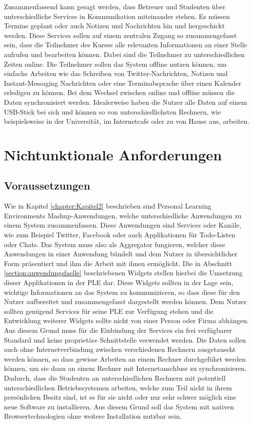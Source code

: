 Zusammenfassend kann gesagt werden, dass Betreuer und Studenten über unterschiedliche Services in Kommunikation miteinander stehen. Es müssen Termine geplant oder auch Notizen und Nachrichten hin und hergeschickt werden. Diese Services sollen auf einem zentralen Zugang so zusammengefasst sein, dass die Teilnehmer des Kurses alle relevanten Informationen an einer Stelle aufrufen und bearbeiten können. Dabei sind die Teilnehmer zu unterschiedlichen Zeiten online. Die Teilnehmer sollen das System offline nutzen können, um einfache Arbeiten wie das Schreiben von Twitter-Nachrichten, Notizen und Instant-Messaging Nachrichten oder eine Terminabsprache über einen Kalender erledigen zu können. Bei dem Wechsel zwischen online und offline müssen die Daten synchronisiert werden. Idealerweise haben die Nutzer alle Daten auf einem USB-Stick bei sich und können so von unterschiedlichsten Rechnern, wie beispielsweise in der Universität, im Internetcafe oder zu von Hause aus, arbeiten.

\section{Nichtunktionale Anforderungen}\label{section:nichtfunktionale_anforderunge}

\subsection{Voraussetzungen}
Wie in Kapitel \ref{chapter:Kapitel2} beschrieben sind Personal Learning Environments Mashup-Anwendungen, welche unterschiedliche Anwendungen zu einem System zusammenfassen. Diese Anwendungen sind Services oder Kanäle, wie zum Beispiel Twitter, Facebook oder auch Applikationen für Todo-Listen oder Chats. Das System muss also als Aggregator fungieren, welcher diese Anwendungen in einer Anwendung bündelt und dem Nutzer in übersichtlicher Form präsentiert und ihm die Arbeit mit ihnen ermöglicht. Die in Abschnitt \ref{section:anwendungsfaelle} beschriebenen Widgets stellen hierbei die Umsetzung dieser Applikationen in der PLE dar. Diese Widgets sollten in der Lage sein, wichtige Informationen an das System zu kommunizieren, so dass diese für den Nutzer aufbereitet und zusammengefasst dargestellt werden können. Dem Nutzer sollten genügend Services für seine PLE zur Verfügung stehen und die Entwicklung weiterer Widgets sollte nicht von einer Person oder Firma abhängen. Aus diesem Grund muss für die Einbindung der Services ein frei verfügbarer Standard und keine proprietäre Schnittstelle verwendet werden. Die Daten sollen auch ohne Internetverbindung zwischen verschiedenen Rechnern ausgetauscht werden können, so dass gewisse Arbeiten an einem Rechner durchgeführt werden können, um sie dann an einem Rechner mit Internetanschluss zu synchronisieren. Dadurch, dass die Studenten an unterschiedlichen Rechnern mit potentiell unterschiedlichen Betriebssystemen arbeiten, welche zum Teil nicht in ihrem persönlichen Besitz sind, ist es für sie nicht oder nur sehr schwer möglich eine neue Software zu installieren. Aus diesem Grund soll das System mit nativen Browsertechnologien ohne weitere Installation nutzbar sein.

